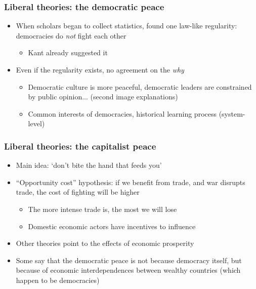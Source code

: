 \documentclass[aspectratio=43]{beamer}
\begin{document}
\begin{frame}
\frametitle{Liberal theories: the democratic peace}
\centering

\begin{itemize}

\item<1-> When scholars began to collect statistics, found one law-like regularity: democracies do \textit{not} fight each other
  \begin{itemize}
  \item Kant already suggested it
  \end{itemize}
\item<2-> Even if the regularity exists, no agreement on the \textit{why}
  \begin{itemize}
  \item Democratic culture is more peaceful, democratic leaders are constrained by public opinion... (second image explanations)
  \item Common interests of democracies, historical learning process (system-level)
  \end{itemize}
\end{itemize}

\end{frame}

\begin{frame}
\frametitle{Liberal theories: the capitalist peace}
\centering

\begin{itemize}
\item<1-> Main idea: `don't bite the hand that feeds you'
\item<2-> ``Opportunity cost'' hypothesis: if we benefit from trade, and war disrupts trade, the cost of fighting will be higher
  \begin{itemize}
  \item The more intense trade is, the most we will lose
  \item Domestic economic actors have incentives to influence
  \end{itemize}
\item<3-> Other theories point to the effects of economic prosperity
\item<4-> Some say that the democratic peace is not because democracy itself, but because of economic interdependences between wealthy countries (which happen to be democracies)
\end{itemize}

\end{frame}
\end{document}
